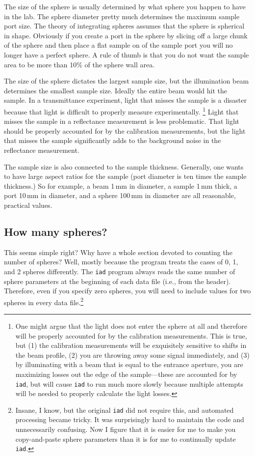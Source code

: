 \documentclass{article}
\newcommand\iadprog{\texttt{iad}}
\begin{document}
The size of the sphere is usually determined by what sphere you happen to
have in the lab.  The sphere diameter pretty much determines the maximum
sample port size.  The theory of integrating spheres assumes that the sphere
is spherical in shape.  Obviously if you create a port in the sphere by 
slicing off a large chunk of the sphere and then place a flat sample 
on of the sample port you will no longer have a perfect sphere.  A rule of
thumb is that you do not want the sample area to be more than 10\% of the
sphere wall area.  

The size of the sphere dictates the largest sample size, but the illumination
beam determines the smallest sample size.  Ideally the entire beam would hit the
sample.  In a transmittance experiment, light that misses the sample is a
disaster because that light is difficult to properly measure experimentally.%
\footnote{One might argue that the light does not enter the sphere at all and therefore
will be properly accounted for by the calibration measurements.  This is true, but
(1) the calibration measurements will be exquisitely sensitive to shifts in the beam
profile, (2) you are throwing away some signal immediately, and (3) by illuminating
with a beam that is equal to the entrance aperture, you are maximizing losses out
the edge of the sample---these are accounted for by \iadprog{}, but will cause 
\iadprog{} to run much more slowly because multiple attempts will be needed to
properly calculate the light losses.}
Light that misses the sample in a reflectance measurement is less problematic.
That light should be properly accounted for by the calibration measurements, but
the light that misses the sample significantly adds to the background noise
in the reflectance measurement.

The sample size is also connected to the sample thickness.  Generally, one
wants to have large aspect ratios for the sample (port diameter is ten times
the sample thickness.)  So for example, a beam 1\,mm in diameter, 
a sample 1\,mm thick, a port 10\,mm in diameter, and a sphere 100\,mm in diameter 
are all reasonable, practical values.

\subsection{How many spheres?}

This seems simple right?  Why have a whole section devoted to counting the number 
of spheres?  Well, mostly because the program treats the cases of 0, 1, and 2
spheres differently.  The \iadprog{} program always reads the same number of sphere parameters at the beginning of each data file (i.e., from the header).  Therefore, even
if you specify zero spheres, you will need to include values for two spheres 
in every data file.\footnote{Insane, I know, but the original \iadprog{} did not require this,
and automated processing became tricky.  It was surprisingly
hard to maintain the code and unnecessarily confusing.  Now I figure that it is easier
for me to make you copy-and-paste sphere parameters than it is for me to continually update
\iadprog{}.}
\end{document}
